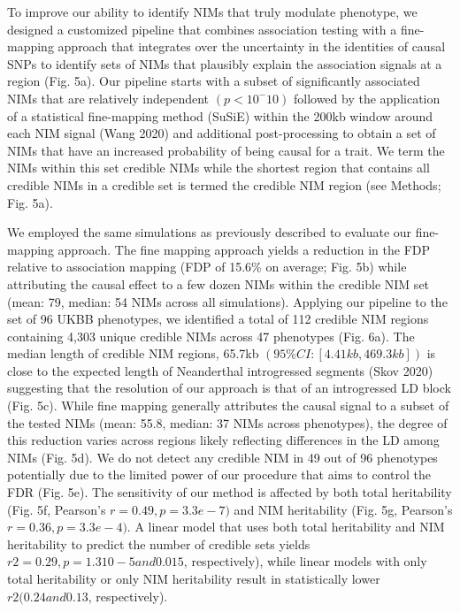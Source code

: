 To improve our ability to identify NIMs that truly modulate phenotype, we designed a customized pipeline that combines association testing with a fine-mapping approach that integrates over the uncertainty in the identities of causal SNPs to identify sets of NIMs that plausibly explain the association signals at a region (Fig. 5a). Our pipeline starts with a subset of significantly associated NIMs that are relatively independent $(p < 10^-10)$ followed by the application of a statistical fine-mapping method (SuSiE) within the 200kb window around each NIM signal (Wang 2020) and additional post-processing to obtain a set of NIMs that have an increased probability of being causal for a trait. We term the NIMs within this set credible NIMs while the shortest region that contains all credible NIMs in a credible set is termed the credible NIM region (see Methods; Fig. 5a). 

We employed the same simulations as previously described to evaluate our fine-mapping approach. The fine mapping approach yields a reduction in the FDP relative to association mapping (FDP of 15.6\% on average; Fig. 5b) while attributing the causal effect to a few dozen NIMs within the credible NIM set (mean: 79, median: 54 NIMs across all simulations). Applying our pipeline to the set of 96 UKBB phenotypes, we identified a total of 112 credible NIM regions containing 4,303 unique credible NIMs across 47 phenotypes (Fig. 6a). The median length of credible NIM regions, 65.7kb $(95\% CI: [4.41kb, 469.3 kb])$ is close to the expected length of Neanderthal introgressed segments (Skov 2020) suggesting that the resolution of our approach is that of an introgressed LD block (Fig. 5c). While fine mapping generally attributes the causal signal to a subset of the tested NIMs (mean: 55.8, median: 37 NIMs across phenotypes), the degree of this reduction varies across regions likely reflecting differences in the LD among NIMs (Fig. 5d). We do not detect any credible NIM in 49 out of 96 phenotypes potentially due to the limited power of our procedure that aims to control the FDR (Fig. 5e). The sensitivity of our method is affected by both total heritability (Fig. 5f, Pearson’s $r = 0.49 , p = 3.3e-7)$  and NIM heritability (Fig. 5g, Pearson’s $r = 0.36, p = 3.3e-4)$. A linear model that uses both total heritability and NIM heritability to predict the number of credible sets yields $r2 = 0.29, p = 1.310-5 and 0.015$, respectively), while linear models with only total heritability or only NIM heritability result in statistically lower $r2 (0.24 and 0.13$, respectively).
